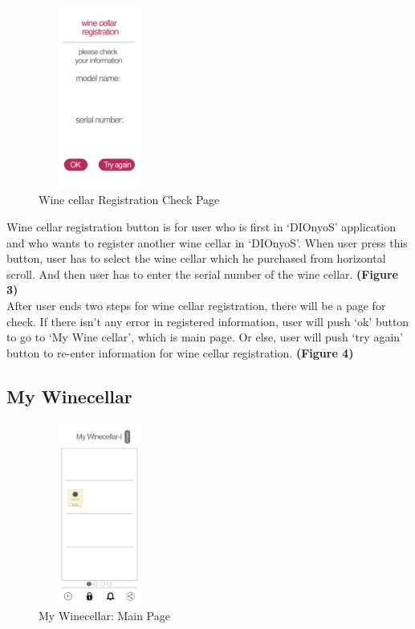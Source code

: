 \documentclass[sigconf, nonacm]{acmart}
\begin{document}
\begin{figure}
  \centering
  \includegraphics[width=4cm, height=6cm]{regicheck.png}
  \caption{Wine cellar Registration Check Page}
  \label{fig:Wine cellar Registration Check Page}
\end{figure}

Wine cellar registration button is for user who is first in
‘DIOnyoS’ application and who wants to register another
wine cellar in ‘DIOnyoS’. When user press this button,
user has to select the wine cellar which he purchased
from horizontal scroll. And then user has to enter the
serial number of the wine cellar. \textbf{(Figure 3)}\\
After user ends two steps for wine cellar registration,
there will be a page for check. If there isn’t any error in
registered information, user will push ‘ok’ button to go
to ‘My Wine cellar’, which is main page. Or else, user
will push ‘try again’ button to re-enter information for
wine cellar registration. \textbf{(Figure 4)}\\

\clearpage

\noindent \subsection{My Winecellar}
\begin{figure}
  \centering
  \includegraphics[width=4cm, height=6cm]{mywinece.png}
  \caption{My Winecellar: Main Page}
  \label{fig:My Winecellar}
\end{figure}
\end{document}
